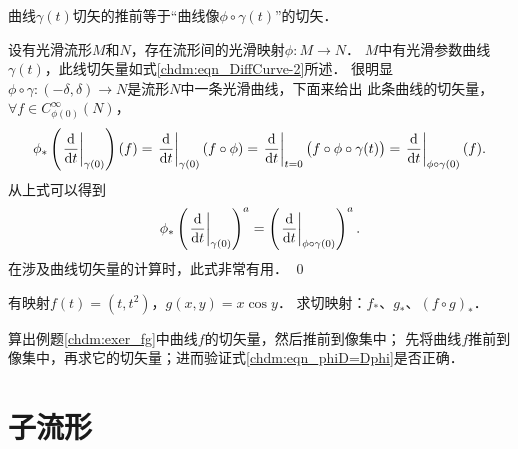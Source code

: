 \begin{example}\label{chdm:exm_phiD=Dphi}
    曲线$\gamma(t)$切矢的推前等于“曲线像$\phi\circ\gamma(t)$”的切矢．
\end{example}
设有光滑流形$M$和$N$，存在流形间的光滑映射$\phi:M\to N$．
$M$中有光滑参数曲线$\gamma(t)$，此线切矢量如式\eqref{chdm:eqn_DiffCurve-2}所述．
很明显$\phi\circ\gamma:(-\delta,\delta)\to N$是流形$N$中一条光滑曲线，下面来给出
此条曲线的切矢量，$\forall f\in C^\infty_{\phi(0)}(N)$，
\begin{align*}
    \phi_{*}\left(\left.\frac{{\rm d}  }{{\rm d} t}\right|_{\gamma(0)}\right) (f)
    = \left.\frac{{\rm d}  }{{\rm d} t}\right|_{\gamma(0)} (f\circ \phi)
    = \left.\frac{{\rm d}  }{{\rm d} t}\right|_{t=0} \bigl(f\circ \phi\circ\gamma(t)\bigr)
    = \left.\frac{{\rm d}  }{{\rm d} t}\right|_{\phi\circ\gamma(0)} (f) .
\end{align*}
从上式可以得到
\begin{equation}\label{chdm:eqn_phiD=Dphi}
    \phi_{*}\left(\left.\frac{{\rm d}  }{{\rm d} t}\right|_{\gamma(0)}\right)^a
    = \left(\left.\frac{{\rm d}  }{{\rm d} t}\right|_{\phi\circ\gamma(0)}\right)^a.
\end{equation}
在涉及曲线切矢量的计算时，此式非常有用．  
\qed


\begin{exercise}\label{chdm:exer_fg}
	有映射$f(t)=(t,t^2)$，$g(x,y)=x \cos y$．
	求切映射：$f_*$、$g_*$、$(f\circ g)_*$．
\end{exercise}

\begin{exercise}
	算出例题\ref{chdm:exer_fg}中曲线$f$的切矢量，然后推前到像集中；
	先将曲线$f$推前到像集中，再求它的切矢量；进而验证式\eqref{chdm:eqn_phiD=Dphi}是否正确．
\end{exercise}



\section{子流形}\label{chdm:sec_sub-manifold}



